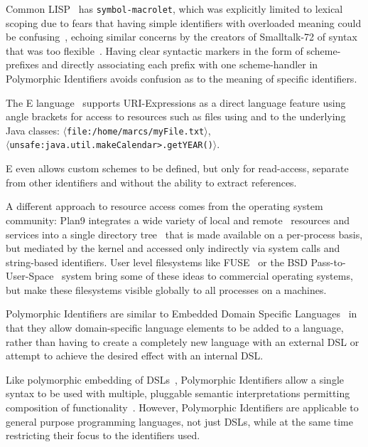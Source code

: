 \documentclass{acm_proc_article-sp}
\begin{document}
Common LISP~\cite{Steele:1990:CLL:95411} has {\tt symbol-macrolet}, which was explicitly limited to lexical scoping due to fears 
that having simple identifiers with overloaded meaning could be confusing~\cite{gabriel-lisp-identifiers}, echoing similar concerns by the creators
of Smalltalk-72 of syntax that was too flexible~\cite{Kay:1996:EHS:234286.1057828}.  Having clear syntactic markers in the form of scheme-prefixes
and directly associating each prefix with one scheme-handler in Polymorphic Identifiers avoids confusion as to the meaning of specific identifiers.

The E language~\cite{MillerRobustComposition}  supports URI-Expressions as a direct language feature using angle brackets for access to 
resources such as files using and to the underlying Java classes:   {\tt $\langle$file:/home/marcs/myFile.txt$\rangle$},  \\ {\tt $\langle$unsafe:java.util.makeCalendar>.getYEAR()$\rangle$}.

E even allows custom schemes to be defined, but  only for read-access, separate from other identifiers and without the ability to extract references.

A different approach to resource access comes from the operating system community:  Plan9 
integrates a wide variety of local and remote~\cite{plan9network} resources and services into a single directory tree~\cite{plan9names} that is made available on a per-process basis, but mediated by the kernel and accessed only indirectly via system calls and string-based
identifiers.
User level filesystems like FUSE~\cite{fuse} or the BSD Pass-to-User-Space~\cite{kantee:puffs} 
system bring some of these ideas to commercial operating systems, but make these filesystems visible globally to all
processes on a machines. 


Polymorphic Identifiers are similar to Embedded Domain Specific Languages~\cite{edsl}
in that they allow domain-specific language elements to be added to a language, rather
than having to create a completely new language with an external DSL or attempt to 
achieve the desired effect with an internal DSL\cite{fowlerdsl}.  

Like polymorphic embedding of DSLs~\cite{polydsl}, Polymorphic Identifiers allow
a single syntax to be used with multiple, pluggable semantic interpretations permitting
composition of functionality~\cite{embeddeddsl}.  However, Polymorphic Identifiers
are applicable to general purpose programming languages, not just DSLs, while
at the same time restricting their focus to the identifiers used.
\end{document}
